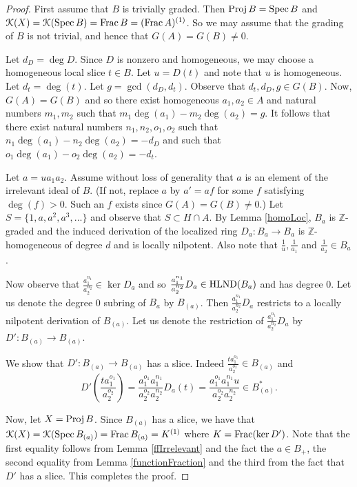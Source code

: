 \documentclass[12pt]{amsart}
\theoremstyle{plain}
\theoremstyle{definition}
\newcommand{\Spec}{		\operatorname{{\rm Spec}}}
\newcommand{\Proj}{		\operatorname{{\rm Proj}}}
\newcommand{\Frac}{		\operatorname{{\rm Frac}}}
\newcommand{\Integ}{\ensuremath{\mathbb{Z}}}
\newcommand{\Keul}{\EuScript{K}}
\newcommand{\hlnd}{\operatorname{{\rm HLND}}}
\begin{document}
	\begin{proof}
		First assume that $B$ is trivially graded. Then $\Proj B = \Spec B$ and $\Keul(X) = \Keul(\Spec B) = \Frac B = (\Frac A)^{(1)}$. So we may assume that the grading of $B$ is not trivial, and hence that $G(A) = G(B) \neq 0$.  
		
		Let $d_D = \deg D$. Since $D$ is nonzero and homogeneous, we may choose a homogeneous local slice $t \in B$. Let $u = D(t)$ and note that $u$ is homogeneous. Let $d_t = \deg(t)$. Let $g = \gcd(d_D,d_t)$. Observe that $d_t,d_D,g \in G(B)$. Now, $G(A) = G(B)$ and so there exist homogeneous $a_1,a_2 \in A$ and natural numbers $m_1,m_2$ such that $m_1\deg(a_1) - m_2\deg(a_2) = g$. It follows that there exist natural numbers $n_1,n_2,o_1,o_2$ such that $n_1\deg(a_1) - n_2 \deg(a_2) = -d_D$ and such that $o_1\deg(a_1) - o_2 \deg(a_2) = -d_t$. 
		
		Let $a = ua_1a_2$. Assume without loss of generality that $a$ is an element of the irrelevant ideal of $B$. (If not, replace $a$ by $a' = af$ for some $f$ satisfying $\deg(f) > 0$. Such an $f$ exists since $G(A) = G(B) \neq 0$.) Let $S = \{1, a, a^2, a^3, ... \}$ and observe that $S \subset H \cap A$. By Lemma \ref{homoLoc}, $B_a$ is $\Integ$-graded and the induced derivation of the localized ring $D_a: B_a \to B_a$ is $\Integ$-homogeneous of degree $d$ and is locally nilpotent. Also note that $\frac{1}{u},\frac{1}{a_1}$ and $\frac{1}{a_2} \in B_a$.  
		
		Now observe that $\frac{a_1^{n_1}}{a_2^{n_2}} \in \ker D_a$ and so $\frac{a_1^{n_1}}{a_2^{n_2}} D_a \in \hlnd(B_a)$ and has degree 0. Let us denote the degree 0 subring of $B_a$ by $B_{(a)}$. Then $\frac{a_1^{n_1}}{a_2^{n_2}} D_a$ restricts to a locally nilpotent derivation of $B_{(a)}$. Let us denote the restriction of $\frac{a_1^{n_1}}{a_2^{n_2}} D_a$ by $D' : B_{(a)} \to  B_{(a)}$.  
		
		We show that $D': B_{(a)} \to B_{(a)}$ has a slice. Indeed $\frac{ta_1^{o_1}}{a_2^{o_2}} \in B_{(a)}$ and $$D'(\frac{ta_1^{o_1}}{a_2^{o_2}}) = \frac{a_1^{o_1}a_1^{n_1}}{a_2^{o_2}a_2^{n_2}}D_a(t) = \frac{a_1^{o_1}a_1^{n_1}u}{a_2^{o_2}a_2^{n_2}} \in B_{(a)}^*.$$ 
		
		Now, let $X = \Proj B$. Since $B_{(a)}$ has a slice, we have that $\Keul(X) = \Keul(\Spec B_{(a)}) = \Frac B_{(a)}= K^{(1)}$ where $K = \Frac(\ker D')$. Note that the first equality follows from Lemma \ref{ffIrrelevant} and the fact the $a \in B_+$, the second equality from Lemma \ref{functionFraction} and the third from the fact that $D'$ has a slice. This completes the proof.     
	\end{proof}
	
\end{document}

